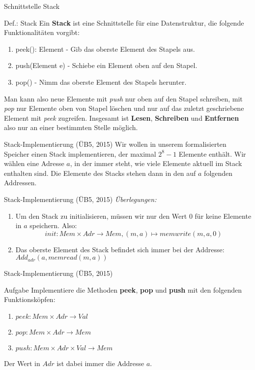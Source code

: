 \begin{frame}{Schnittstelle Stack}
	\begin{block}{Def.: Stack}
		Ein \textbf{Stack} ist eine Schnittstelle für eine Datenstruktur, die folgende Funktionalitäten vorgibt:
		\begin{enumerate}
			\item peek(): Element  -  Gib das oberste Element des Stapels aus.
			\item push(Element e)  -  Schiebe ein Element oben auf den Stapel.
			\item pop()  -  Nimm das oberste Element des Stapels herunter.
		\end{enumerate}

		\medskip

		Man kann also neue Elemente mit \textit{push} nur oben auf den Stapel schreiben, mit \textit{pop} nur Elemente oben von Stapel löschen und nur auf das zuletzt geschriebene Element mit \textit{peek} zugreifen. Insgesamt ist \textbf{Lesen}, \textbf{Schreiben} und \textbf{Entfernen} also nur an einer bestimmten Stelle möglich.
	\end{block}
\end{frame}

\begin{frame}{Stack-Implementierung (ÜB5, 2015)}
	Wir wollen in unserem formalisierten Speicher einen Stack implementieren, der maximal $2^8 - 1$ Elemente enthält. Wir wählen eine Adresse $a$, in der immer steht, wie viele Elemente aktuell im Stack enthalten sind. Die Elemente des Stacks stehen dann in den auf $a$ folgenden Addressen.
\end{frame}
	
\begin{frame}{Stack-Implementierung (ÜB5, 2015)}
	\emph{Überlegungen:}
	\begin{enumerate}
		\item Um den Stack zu initialisieren, müssen wir nur den Wert $0$ für keine Elemente in $a$ speichern. Also:
			\[init: Mem \times Adr \to Mem, (m,a) \mapsto memwrite(m,a,0)\]
		\item Das oberste Element des Stack befindet sich immer bei der Addresse: $Add_{adr}(a, memread(m,a))$
	\end{enumerate}
\end{frame}

\begin{frame}{Stack-Implementierung (ÜB5, 2015)}
	\begin{exampleblock}{Aufgabe}
		Implementiere die Methoden \textbf{peek}, \textbf{pop} und \textbf{push} mit den folgenden Funktionsköpfen:
		\begin{enumerate}
			\item $peek: Mem \times Adr \to Val$
			\item $pop: Mem \times Adr \to Mem$
			\item $push: Mem \times Adr \times Val \to Mem$
		\end{enumerate}
		Der Wert in $Adr$ ist dabei immer die Addresse $a$.
	\end{exampleblock}
\end{frame}

